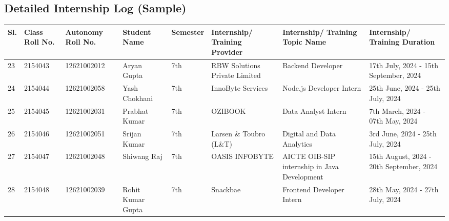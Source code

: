 \documentclass[11pt,a4paper]{article}
\newenvironment{card}{
    \begin{tcolorbox}[
        enhanced,
        colback=cardback,
        colframe=border,
        sharp corners,
        boxrule=0.5pt,
        drop shadow,
        drop shadow={shadow xshift=1mm,shadow yshift=-1mm,fill=border!50},
        boxsep=3mm,
        left=5mm, right=5mm, top=5mm, bottom=5mm,
        width=\textwidth,
        nobeforeafter
    ]
}{\end{tcolorbox}}
\begin{document}
\vspace{0.5cm}

\begin{card}
    \subsection*{\textcolor{accent}{Detailed Internship Log (Sample)}}
    \vspace{0.3cm}
    \begin{longtable}{@{}p{}p{}p{}p{}p{}p{}p{}p{}@{}}
        \toprule
        \textbf{Sl.} & \textbf{Class Roll No.} & \textbf{Autonomy Roll No.} & \textbf{Student Name} & \textbf{Semester} & \textbf{Internship/ Training Provider} & \textbf{Internship/ Training Topic Name} & \textbf{Internship/ Training Duration} \\
        \midrule
        \endhead
        23 & 2154043 & 12621002012 & Aryan Gupta & 7th & RBW Solutions Private Limited & Backend Developer & 17th July, 2024 - 15th September, 2024 \\
        24 & 2154044 & 12621002058 & Yash Chokhani & 7th & InnoByte Services & Node.js Developer Intern & 25th June, 2024 - 25th July, 2024 \\
        25 & 2154045 & 12621002031 & Prabhat Kumar & 7th & OZIBOOK & Data Analyst Intern & 7th March, 2024 - 07th May, 2024 \\
        26 & 2154046 & 12621002051 & Srijan Kumar & 7th & Larsen \& Toubro (L\&T) & Digital and Data Analytics & 3rd June, 2024 - 25th July, 2024 \\
        27 & 2154047 & 12621002048 & Shiwang Raj & 7th & OASIS INFOBYTE & AICTE OIB-SIP internship in Java Development & 15th August, 2024 - 20th September, 2024 \\
        28 & 2154048 & 12621002039 & Rohit Kumar Gupta & 7th & Snackbae & Frontend Developer Intern & 28th May, 2024 - 27th July, 2024 \\
        \bottomrule
    \end{longtable}
\end{card}

\vspace{0.5cm}
\end{document}
